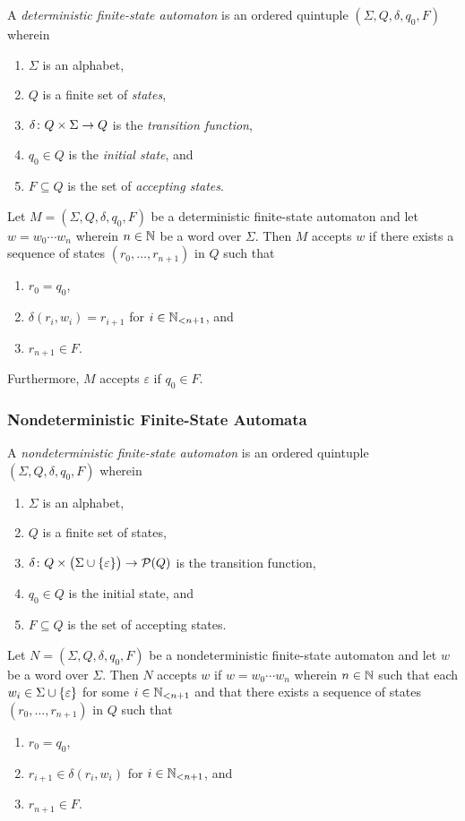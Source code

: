 \Bdf
  A \emph{deterministic finite-state automaton} is an ordered quintuple \((\Sigma, Q, \delta, q_0, F)\) wherein
  \begin{enumerate}
    \item \(\Sigma\) is an alphabet,
    \item \(Q\) is a finite set of \emph{states},
    \item \(\map{\delta}{Q \times \Sigma}{Q}\) is the \emph{transition function},
    \item \(q_0 \in Q\) is the \emph{initial state}, and
    \item \(F \subseteq Q\) is the set of \emph{accepting states}.
  \end{enumerate}
\Edf

Let \(M = (\Sigma, Q, \delta, q_0, F)\) be a deterministic finite-state automaton and let \(w = w_0 \cdots w_n\) wherein
\(n \in \setnat\) be a word over \(\Sigma\).  Then \(M\) accepts \(w\) if there exists a sequence of states \((r_0,
\ldots, r_{n + 1})\) in \(Q\) such that
\begin{enumerate}
  \item \(r_0 = q_0\),
  \item \(\delta(r_i, w_i) = r_{i + 1}\) for \(i \in \Nln[n + 1]\), and
  \item \(r_{n + 1} \in F\).
\end{enumerate}
Furthermore, \(M\) accepts \(\varepsilon\) if \(q_0 \in F\).

\subsubsection{Nondeterministic Finite-State Automata}

\Bdf
  A \emph{nondeterministic finite-state automaton} is an ordered quintuple \((\Sigma, Q, \delta, q_0, F)\) wherein
  \begin{enumerate}
    \item \(\Sigma\) is an alphabet,
    \item \(Q\) is a finite set of states,
    \item \(\map{\delta}{Q \times \big(\Sigma \cup \set{\varepsilon}\big)}{\pow(Q)}\) is the transition function,
    \item \(q_0 \in Q\) is the initial state, and
    \item \(F \subseteq Q\) is the set of accepting states.
  \end{enumerate}
\Edf

Let \(N = (\Sigma, Q, \delta, q_0, F)\) be a nondeterministic finite-state automaton and let \(w\) be a word over
\(\Sigma\). Then \(N\) accepts \(w\) if \(w = w_0 \cdots w_n\) wherein \(n \in \setnat\) such that each
\(w_i \in \Sigma \cup \set{\varepsilon}\) for some \(i \in \Nln[n + 1]\) and that there exists a sequence of states
\((r_0, \ldots, r_{n + 1})\) in \(Q\) such that
\begin{enumerate}
  \item \(r_0 = q_0\),
  \item \(r_{i + 1} \in \delta(r_i, w_i)\) for \(i \in \Nln[n + 1]\), and
  \item \(r_{n + 1} \in F\).
\end{enumerate}

